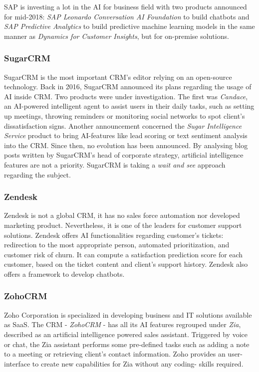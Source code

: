 SAP is investing a lot in the AI for business field with two products announced for mid-2018: \textit{SAP Leonardo Conversation AI Foundation} to build chatbots and \textit{SAP Predictive Analytics} to build predictive machine learning models in the same manner as \textit{Dynamics for Customer Insights}, but for on-premise solutions.


\subsubsection*{SugarCRM}
SugarCRM is the most important CRM's editor relying on an open-source technology. Back in 2016, SugarCRM announced its plans regarding the usage of AI inside CRM. Two products were under investigation. The first was \textit{Candace}, an AI-powered intelligent agent to assist users in their daily tasks, such as setting up meetings, throwing reminders or monitoring social networks to spot client's dissatisfaction signs. Another announcement concerned the \textit{Sugar Intelligence Service} product to bring AI-features like lead scoring or text sentiment analysis into the CRM. Since then, no evolution has been announced. By analysing blog posts written by SugarCRM's head of corporate strategy, artificial intelligence features are not a priority. SugarCRM is taking a \textit{wait and see} approach \cite{sugarcrm1,sugarcrm2} regarding the subject.

\subsubsection*{Zendesk}
Zendesk is not a global CRM, it has no sales force automation nor developed marketing product. Nevertheless, it is one of the leaders for customer support solutions. Zendesk offers AI functionalities regarding customer's tickets: redirection to the most appropriate person, automated prioritization, and customer risk of churn. It can compute a satisfaction prediction score for each customer, based on the ticket content and client's support history. Zendesk also offers a framework to develop chatbots.

\subsubsection*{ZohoCRM}
Zoho Corporation is specialized in developing business and IT solutions available as SaaS. The CRM - \textit{ZohoCRM} - has all its AI features regrouped under \textit{Zia}, described as an artificial intelligence powered sales assistant. Triggered by voice or chat, the Zia assistant performs some pre-defined tasks such as adding a note to a meeting or retrieving client's contact information. Zoho provides an user-interface to create new capabilities for Zia without any coding- skills required.


